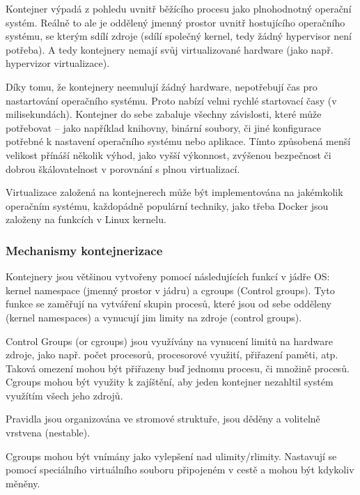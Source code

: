 \documentclass[thesis=M,czech]{FITthesis}[2019/12/23]
\theoremstyle{plain}
\theoremstyle{definition}
\begin{document}
Kontejner výpadá z pohledu uvnitř běžícího procesu jako plnohodnotný operační systém. Reálně to ale je oddělený jmenný prostor uvnitř hostujícího operačního systému, se kterým sdílí zdroje (sdílí společný kernel, tedy žádný hypervisor není potřeba). A tedy kontejnery nemají svůj virtualizované hardware (jako např. hypervizor virtualizace). 

Díky tomu, že kontejnery neemulují žádný hardware, nepotřebují čas pro nastartování operačního systému. Proto nabízí velmi rychlé startovací časy (v milisekundách). Kontejner do sebe zabaluje všechny závislosti, které může potřebovat -- jako například knihovny, binární soubory, či jiné konfigurace potřebné k nastavení operačního systému nebo aplikace. Tímto způsobená menší velikost přínáší několik výhod, jako vyšší výkonnost, zvýšenou bezpečnost či dobrou škálovatelnost v porovnání s plnou virtualizací.

Virtualizace založená na kontejnerech může být implementována na jakémkolik operačním systému, každopádně populární techniky, jako třeba Docker jsou založeny na funkcích v Linux kernelu. 


\subsubsection{Mechanismy kontejnerizace}

Kontejnery jsou většinou vytvořeny pomocí následujících funkcí v jádře OS: kernel namespace (jmenný prostor v jádru) a cgroups (Control groups). Tyto funkce se zaměřují na vytváření skupin procesů, které jsou od sebe odděleny (kernel namespaces) a vynucují jim limity na zdroje (control groups).


Control Groups (or cgroups) jsou využívány na vynucení limitů na hardware zdroje, jako např. počet procesorů, procesorové využití, přiřazení paměti, atp. Taková omezení mohou být přiřazeny buď jednomu procesu, či množině procesů. Cgroups mohou být využity k zajíštění, aby jeden kontejner nezahltil systém využítím všech jeho zdrojů. 

Pravidla jsou organizována ve stromové struktuře, jsou děděny a volitelně vrstvena (nestable).

Cgroups mohou být vnímány jako vylepšení nad ulimity/rlimity. Nastavují se pomocí speciálního virtuálního souboru připojeném v cestě  a mohou být kdykoliv měněny.
\end{document}
